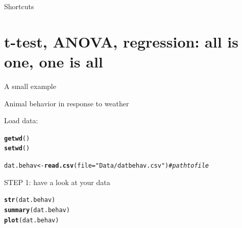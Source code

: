 \documentclass[10pt]{beamer}\usepackage[]{graphicx}\usepackage[]{color}
\makeatletter
\newcommand{\hlstr}[1]{\textcolor[rgb]{0.192,0.494,0.8}{#1}}%
\newcommand{\hlcom}[1]{\textcolor[rgb]{0.678,0.584,0.686}{\textit{#1}}}%
\newcommand{\hlstd}[1]{\textcolor[rgb]{0.345,0.345,0.345}{#1}}%
\newcommand{\hlkwb}[1]{\textcolor[rgb]{0.69,0.353,0.396}{#1}}%
\newcommand{\hlkwc}[1]{\textcolor[rgb]{0.333,0.667,0.333}{#1}}%
\newcommand{\hlkwd}[1]{\textcolor[rgb]{0.737,0.353,0.396}{\textbf{#1}}}%
\newenvironment{kframe}{%
 \def\at@end@of@kframe{}%
 \ifinner\ifhmode%
  \def\at@end@of@kframe{\end{minipage}}%
  \begin{minipage}{\columnwidth}%
 \fi\fi%
 \def\FrameCommand##1{\hskip\@totalleftmargin \hskip-\fboxsep
 \colorbox{shadecolor}{##1}\hskip-\fboxsep
     \hskip-\linewidth \hskip-\@totalleftmargin \hskip\columnwidth}%
 \MakeFramed {\advance\hsize-\width
   \@totalleftmargin\z@ \linewidth\hsize
   \@setminipage}}%
 {\par\unskip\endMakeFramed%
 \at@end@of@kframe}
\newenvironment{knitrout}{}{} %
\makeatother
\begin{document}
\begin{frame}{Shortcuts}


\end{frame}

\section{t-test, ANOVA, regression: all is one, one is all}

\begin{frame}[fragile]{A small example}

Animal behavior in response to weather



Load data:
\begin{knitrout}
\color{fgcolor}\begin{kframe}
\begin{alltt}
\hlkwd{getwd}\hlstd{()}
\hlkwd{setwd}\hlstd{()}
\end{alltt}
\end{kframe}
\end{knitrout}

\begin{knitrout}
\color{fgcolor}\begin{kframe}
\begin{alltt}
\hlstd{dat.behav} \hlkwb{<-} \hlkwd{read.csv}\hlstd{(}\hlkwc{file} \hlstd{=} \hlstr{"Data/datbehav.csv"}\hlstd{)} \hlcom{# path to file}
\end{alltt}
\end{kframe}
\end{knitrout}

\pause
STEP 1: have a look at your data
\begin{knitrout}
\color{fgcolor}\begin{kframe}
\begin{alltt}
\hlkwd{str}\hlstd{(dat.behav)}
\hlkwd{summary}\hlstd{(dat.behav)}
\hlkwd{plot}\hlstd{(dat.behav)}
\end{alltt}
\end{kframe}
\end{knitrout}
\end{frame}
\end{document}
